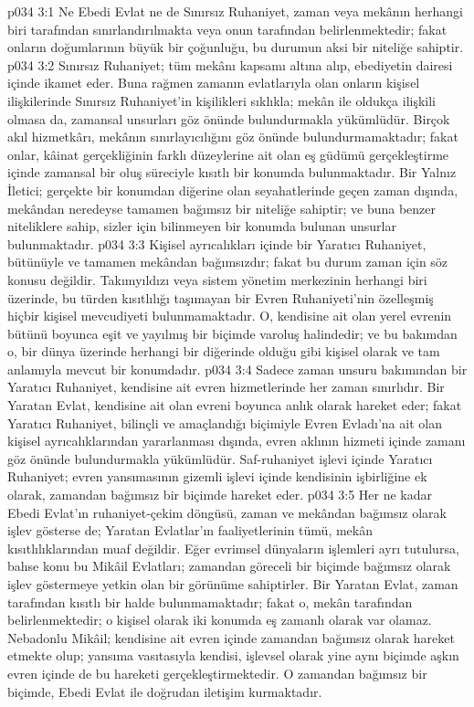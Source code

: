 \vs p034 3:1 Ne Ebedi Evlat ne de Sınırsız Ruhaniyet, zaman veya mekânın herhangi biri tarafından sınırlandırılmakta veya onun tarafından belirlenmektedir; fakat onların doğumlarının büyük bir çoğunluğu, bu durumun aksi bir niteliğe sahiptir.
\vs p034 3:2 Sınırsız Ruhaniyet; tüm mekânı kapsamı altına alıp, ebediyetin dairesi içinde ikamet eder. Buna rağmen zamanın evlatlarıyla olan onların kişisel ilişkilerinde Sınırsız Ruhaniyet’in kişilikleri sıklıkla; mekân ile oldukça ilişkili olmasa da, zamansal unsurları göz önünde bulundurmakla yükümlüdür. Birçok akıl hizmetkârı, mekânın sınırlayıcılığını göz önünde bulundurmamaktadır; fakat onlar, kâinat gerçekliğinin farklı düzeylerine ait olan eş güdümü gerçekleştirme içinde zamansal bir oluş süreciyle kısıtlı bir konumda bulunmaktadır. Bir Yalnız İletici; gerçekte bir konumdan diğerine olan seyahatlerinde geçen zaman dışında, mekândan neredeyse tamamen bağımsız bir niteliğe sahiptir; ve buna benzer niteliklere sahip, sizler için bilinmeyen bir konumda bulunan unsurlar bulunmaktadır.
\vs p034 3:3 Kişisel ayrıcalıkları içinde bir Yaratıcı Ruhaniyet, bütünüyle ve tamamen mekândan bağımsızdır; fakat bu durum zaman için söz konusu değildir. Takımyıldızı veya sistem yönetim merkezinin herhangi biri üzerinde, bu türden kısıtlılığı taşımayan bir Evren Ruhaniyeti’nin özelleşmiş hiçbir kişisel mevcudiyeti bulunmamaktadır. O, kendisine ait olan yerel evrenin bütünü boyunca eşit ve yayılmış bir biçimde varoluş halindedir; ve bu bakımdan o, bir dünya üzerinde herhangi bir diğerinde olduğu gibi kişisel olarak ve tam anlamıyla mevcut bir konumdadır.
\vs p034 3:4 Sadece zaman unsuru bakımından bir Yaratıcı Ruhaniyet, kendisine ait evren hizmetlerinde her zaman sınırlıdır. Bir Yaratan Evlat, kendisine ait olan evreni boyunca anlık olarak hareket eder; fakat Yaratıcı Ruhaniyet, bilinçli ve amaçlandığı biçimiyle Evren Evladı’na ait olan kişisel ayrıcalıklarından yararlanması dışında, evren aklının hizmeti içinde zamanı göz önünde bulundurmakla yükümlüdür. Saf\hyp{}ruhaniyet işlevi içinde Yaratıcı Ruhaniyet; evren yansımasının gizemli işlevi içinde kendisinin işbirliğine ek olarak, zamandan bağımsız bir biçimde hareket eder.
\vs p034 3:5 Her ne kadar Ebedi Evlat’ın ruhaniyet\hyp{}çekim döngüsü, zaman ve mekândan bağımsız olarak işlev gösterse de; Yaratan Evlatlar’ın faaliyetlerinin tümü, mekân kısıtlılıklarından muaf değildir. Eğer evrimsel dünyaların işlemleri ayrı tutulursa, bahse konu bu Mikâil Evlatları; zamandan göreceli bir biçimde bağımsız olarak işlev göstermeye yetkin olan bir görünüme sahiptirler. Bir Yaratan Evlat, zaman tarafından kısıtlı bir halde bulunmamaktadır; fakat o, mekân tarafından belirlenmektedir; o kişisel olarak iki konumda eş zamanlı olarak var olamaz. Nebadonlu Mikâil; kendisine ait evren içinde zamandan bağımsız olarak hareket etmekte olup; yansıma vasıtasıyla kendisi, işlevsel olarak yine aynı biçimde aşkın evren içinde de bu hareketi gerçekleştirmektedir. O zamandan bağımsız bir biçimde, Ebedi Evlat ile doğrudan iletişim kurmaktadır.
